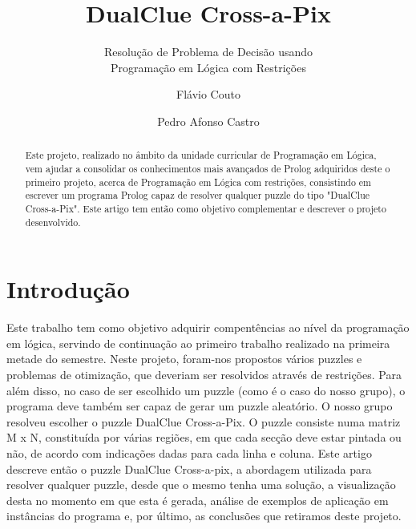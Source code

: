 \documentclass[runningheads,a4paper]{llncs}
\begin{document}
\mainmatter

\title{DualClue Cross-a-Pix}
\subtitle{Resolução de Problema de Decisão usando\\
Programação em Lógica com Restrições}

\author{Flávio Couto\and Pedro Afonso Castro}


\maketitle


\begin{abstract}
Este projeto, realizado no âmbito da unidade curricular de Programação em Lógica, vem ajudar a consolidar os conhecimentos mais avançados de Prolog adquiridos deste o primeiro projeto, acerca de Programação em Lógica com restrições, consistindo em escrever um programa Prolog capaz de resolver qualquer puzzle do tipo "DualClue Cross-a-Pix". Este artigo tem então como objetivo complementar e descrever o projeto desenvolvido.
\end{abstract}


\section{Introdução}

Este trabalho tem como objetivo adquirir compentências ao nível da programação em lógica, servindo de continuação ao primeiro trabalho realizado na primeira metade do semestre. Neste projeto, foram-nos propostos vários puzzles e problemas de otimização, que deveriam ser resolvidos através de restrições. Para além disso, no caso de ser escolhido um puzzle (como é o caso do nosso grupo), o programa deve também ser capaz de gerar um puzzle aleatório.
O nosso grupo resolveu escolher o puzzle DualClue Cross-a-Pix. O puzzle consiste numa matriz M x N, constituída por várias regiões, em que cada secção deve estar pintada ou não, de acordo com indicações dadas para cada linha e coluna.
Este artigo descreve então o puzzle DualClue Cross-a-pix, a abordagem utilizada para resolver qualquer puzzle, desde que o mesmo tenha uma solução, a visualização desta no momento em que esta é gerada, análise de exemplos de aplicação em instâncias do programa e, por último, as conclusões que retiramos deste projeto.
\end{document}
